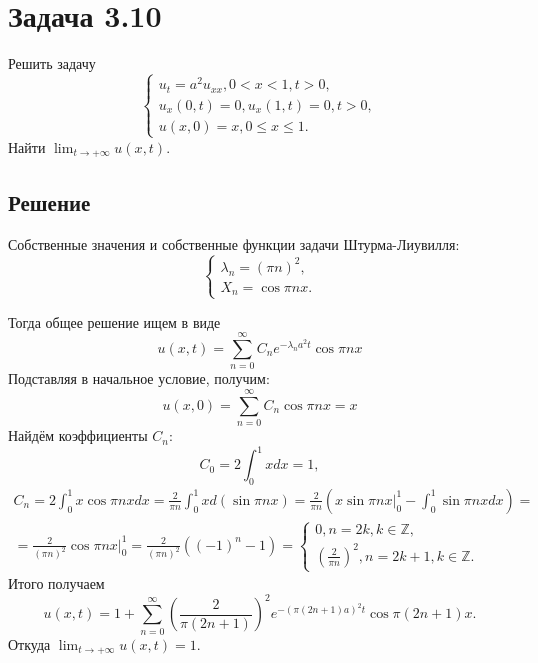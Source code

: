 \documentclass[11pt]{article}
\begin{document}
\section{Задача 3.10}
\label{sec:org4f4a6e0}
Решить задачу
\begin{equation}
\begin{cases}
u_t = a^2u_{xx}, 0 < x < 1, t > 0, \\
u_x(0, t) = 0, u_x(1, t) = 0, t > 0, \\
u(x, 0) = x, 0 \leq x \leq 1.
\end{cases}
\end{equation}
Найти $\lim_{t \to +\infty}u(x, t)$.
\subsection{Решение}
\label{sec:orgdaa3dc3}
Собственные значения и собственные функции задачи Штурма-Лиувилля:
\begin{equation*}
\begin{cases}
\lambda_n = \left(\pi n\right)^2, \\
X_n = \cos\pi nx.
\end{cases}
\end{equation*}

Тогда общее решение ищем в виде
\begin{equation*}
u(x, t) = \sum_{n = 0}^{\infty}C_ne^{-\lambda_na^2t}\cos\pi nx
\end{equation*}
Подставляя в начальное условие, получим:
\begin{equation*}
u(x, 0) = \sum_{n = 0}^{\infty}C_n\cos\pi nx = x
\end{equation*}
Найдём коэффициенты $C_n$:
\begin{equation*}
C_0 = 2\int_0^1xdx = 1,
\end{equation*}
\begin{multline*}
C_n = 2\int_0^1x\cos\pi nxdx = \frac2{\pi n}\int_0^1xd(\sin\pi nx) = \frac2{\pi n}(x\sin\pi nx|_0^1 - \int_0^1\sin\pi nxdx) = \\
= \frac2{(\pi n)^2}\cos\pi nx|_0^1 = \frac2{(\pi n)^2}((-1)^n - 1) =
\begin{cases}
0, n = 2k, k \in \mathbb{Z}, \\
\left(\frac2{\pi n}\right)^2, n = 2k + 1, k \in \mathbb{Z}.
\end{cases}
\end{multline*}
Итого получаем
\begin{equation}
u(x, t) = 1 + \sum_{n = 0}^{\infty}\left(\frac2{\pi(2n + 1)}\right)^2e^{-(\pi(2n + 1)a)^2t}\cos\pi(2n + 1)x.
\end{equation}
Откуда $\lim_{t \to +\infty}u(x, t) = 1$.
\end{document}
